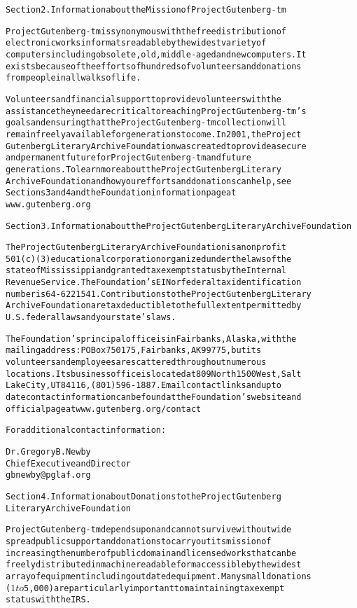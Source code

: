 \documentclass[12pt]{book}[2005/09/16]
\newenvironment{PGtext}{%
\begin{alltt}
%****
\fontsize{8.1}{10}\ttfamily\selectfont}%
{\end{alltt}}
\begin{document}
\begin{PGtext}
Section 2. Information about the Mission of Project Gutenberg-tm

Project Gutenberg-tm is synonymous with the free distribution of
electronic works in formats readable by the widest variety of
computers including obsolete, old, middle-aged and new computers. It
exists because of the efforts of hundreds of volunteers and donations
from people in all walks of life.

Volunteers and financial support to provide volunteers with the
assistance they need are critical to reaching Project Gutenberg-tm's
goals and ensuring that the Project Gutenberg-tm collection will
remain freely available for generations to come. In 2001, the Project
Gutenberg Literary Archive Foundation was created to provide a secure
and permanent future for Project Gutenberg-tm and future
generations. To learn more about the Project Gutenberg Literary
Archive Foundation and how your efforts and donations can help, see
Sections 3 and 4 and the Foundation information page at
www.gutenberg.org



Section 3. Information about the Project Gutenberg Literary Archive Foundation

The Project Gutenberg Literary Archive Foundation is a non profit
501(c)(3) educational corporation organized under the laws of the
state of Mississippi and granted tax exempt status by the Internal
Revenue Service. The Foundation's EIN or federal tax identification
number is 64-6221541. Contributions to the Project Gutenberg Literary
Archive Foundation are tax deductible to the full extent permitted by
U.S. federal laws and your state's laws.

The Foundation's principal office is in Fairbanks, Alaska, with the
mailing address: PO Box 750175, Fairbanks, AK 99775, but its
volunteers and employees are scattered throughout numerous
locations. Its business office is located at 809 North 1500 West, Salt
Lake City, UT 84116, (801) 596-1887. Email contact links and up to
date contact information can be found at the Foundation's web site and
official page at www.gutenberg.org/contact

For additional contact information:

    Dr. Gregory B. Newby
    Chief Executive and Director
    gbnewby@pglaf.org

Section 4. Information about Donations to the Project Gutenberg
Literary Archive Foundation

Project Gutenberg-tm depends upon and cannot survive without wide
spread public support and donations to carry out its mission of
increasing the number of public domain and licensed works that can be
freely distributed in machine readable form accessible by the widest
array of equipment including outdated equipment. Many small donations
($1 to $5,000) are particularly important to maintaining tax exempt
status with the IRS.


\end{PGtext}
\end{document}

